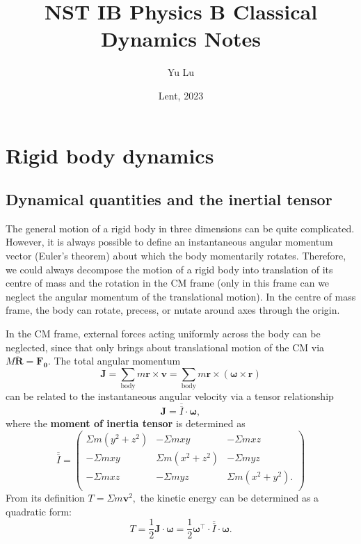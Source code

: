 \documentclass{article}
\title{NST IB Physics B Classical Dynamics Notes}
\date{Lent, 2023}
\author{Yu Lu}
\begin{document}
\maketitle
\section{Rigid body dynamics}
\subsection{Dynamical quantities and the inertial tensor}
The general motion of a rigid body in three dimensions can be quite complicated. However, it is always possible to define an instantaneous angular momentum vector (Euler's theorem) about which the body momentarily rotates. Therefore, we could always decompose the motion of a rigid body into translation of its centre of mass and the rotation in the CM frame (only in this frame can we neglect the angular momentum of the translational motion). In the centre of mass frame, the body can rotate, precess, or nutate around axes through the origin. 

In the CM frame, external forces acting uniformly across the body can be neglected, since that only brings about translational motion of the CM via $M \ddot{\mathbf{R} } = \mathbf{F_0}. $ The total angular momentum 
\[
    \mathbf{J} = \sum\limits_{\text{body}} m \mathbf{r} \times \mathbf{v} 
    = \sum\limits_{\text{body}} m \mathbf{r} \times (\boldsymbol{\mathbf{\omega}}  \times \mathbf{r} )
\]
can be related to the instantaneous angular velocity via a tensor relationship
\[\boxed{
    \mathbf{J} = \overline{\overline{I}} \cdot \boldsymbol{\mathbf{\omega}},}
\]
where the \textbf{moment of inertia tensor} is determined as 
\[
    \overline{\overline{I}} = 
    \begin{pmatrix}
        \Sigma m(y^{2} + z^{2} ) & -\Sigma m x y &  - \Sigma m x z \\
        - \Sigma  m x y & \Sigma m(x^{2} +z^{2} ) &  -\Sigma myz \\
        -\Sigma mxz & -\Sigma myz &  \Sigma m(x^{2} +y^{2} ). \\
    \end{pmatrix}
\]
From its definition $T = \Sigma m\mathbf{v} ^{2}, $ the kinetic energy can be determined as a quadratic form:
\[\boxed{
    T = \frac{1}{2} \mathbf{J} \cdot \boldsymbol{\mathbf{\omega}} 
    = \frac{1}{2} \boldsymbol{\mathbf{\omega}}^{\top} \cdot \overline{\overline{I}} \cdot \boldsymbol{\mathbf{\omega}}.}
\]
\end{document}
